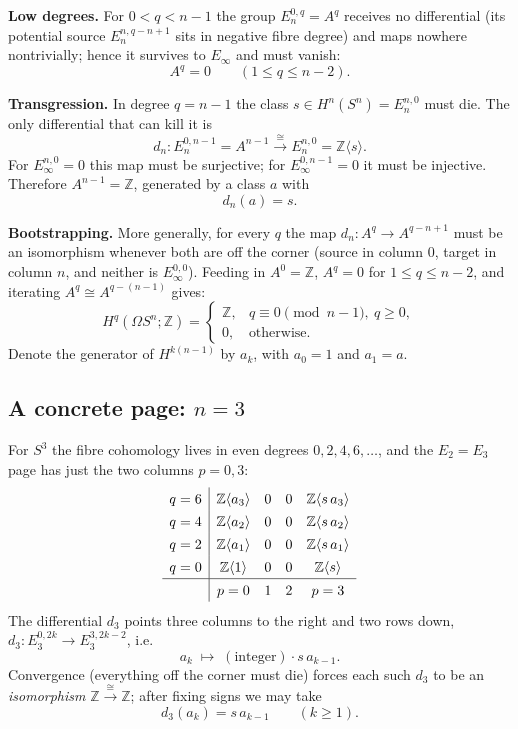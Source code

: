 \documentclass[11pt]{article}
\theoremstyle{definition}
\newcommand{\Z}{\mathbb{Z}}
\begin{document}
\smallskip\noindent\textbf{Low degrees.} For $0<q<n-1$ the group $E_n^{0,q}=A^q$
receives no differential (its potential source $E_n^{n,q-n+1}$ sits in negative
fibre degree) and maps nowhere nontrivially; hence it survives to $E_\infty$ and
must vanish:
\[
  A^q=0\qquad(1\le q\le n-2).
\]

\smallskip\noindent\textbf{Transgression.} In degree $q=n-1$ the class
$s\in H^n(S^n)=E_n^{n,0}$ must die. The only differential that can kill it is
\[
  d_n\colon E_n^{0,n-1}=A^{n-1}\xrightarrow{\ \cong\ }E_n^{n,0}=\Z\langle s\rangle .
\]
For $E_\infty^{n,0}=0$ this map must be surjective; for $E_\infty^{0,n-1}=0$ it
must be injective. Therefore $A^{n-1}=\Z$, generated by a class $a$ with
\begin{equation}\label{eq:transgress}
  d_n(a)=s .
\end{equation}

\smallskip\noindent\textbf{Bootstrapping.} More generally, for every $q$ the map
$d_n\colon A^{q}\to A^{q-n+1}$ must be an isomorphism whenever both are off the
corner (source in column $0$, target in column $n$, and neither is
$E_\infty^{0,0}$). Feeding in $A^0=\Z$, $A^{q}=0$ for $1\le q\le n-2$, and
iterating $A^{q}\cong A^{q-(n-1)}$ gives:
\begin{equation}\label{eq:additive}
  H^{q}(\Omega S^n;\Z)=
  \begin{cases}\Z,& q\equiv 0\pmod{n-1},\ q\ge 0,\\[2pt] 0,&\text{otherwise.}\end{cases}
\end{equation}
Denote the generator of $H^{k(n-1)}$ by $a_k$, with $a_0=1$ and $a_1=a$.

\subsection{A concrete page: $n=3$}

For $S^3$ the fibre cohomology lives in even degrees $0,2,4,6,\dots$, and the
$E_2=E_3$ page has just the two columns $p=0,3$:
\[
\renewcommand{\arraystretch}{1.35}
\begin{array}{c|cccc}
 q=6 & \Z\langle a_3\rangle & 0 & 0 & \Z\langle s\,a_3\rangle \\
 q=4 & \Z\langle a_2\rangle & 0 & 0 & \Z\langle s\,a_2\rangle \\
 q=2 & \Z\langle a_1\rangle & 0 & 0 & \Z\langle s\,a_1\rangle \\
 q=0 & \Z\langle 1\rangle   & 0 & 0 & \Z\langle s\rangle \\ \hline
     & p=0 & 1 & 2 & p=3
\end{array}
\]
The differential $d_3$ points three columns to the right and two rows down,
$d_3\colon E_3^{0,2k}\to E_3^{3,2k-2}$, i.e.
\[
  a_k\;\longmapsto\; (\text{integer})\cdot s\,a_{k-1}.
\]
Convergence (everything off the corner must die) forces each such $d_3$ to be an
\emph{isomorphism} $\Z\xrightarrow{\cong}\Z$; after fixing signs we may take
\begin{equation}\label{eq:d3loop}
  d_3(a_k)=s\,a_{k-1}\qquad(k\ge 1).
\end{equation}
\end{document}

